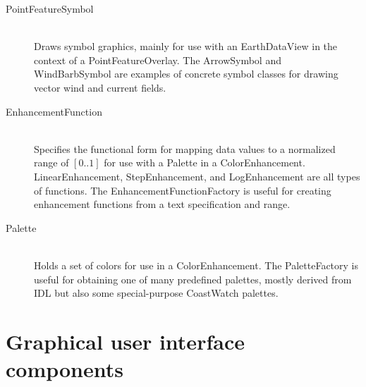 \begin{description}
\item[{\java PointFeatureSymbol}]~\\ Draws symbol graphics, mainly
for use with an {\java EarthDataView} in the context of a {\java
PointFeatureOverlay}.  The {\java ArrowSymbol} and {\java
WindBarbSymbol} are examples of concrete symbol classes for
drawing vector wind and current fields.

\item[{\java EnhancementFunction}]~\\ Specifies the functional
form for mapping data values to a normalized range of $[0..1]$
for use with a {\java Palette} in a {\java ColorEnhancement}.
{\java LinearEnhancement}, {\java StepEnhancement}, and {\java
LogEnhancement} are all types of functions.  The {\java
EnhancementFunctionFactory} is useful for creating enhancement
functions from a text specification and range.

\item[{\java Palette}]~\\ Holds a set of colors for use in a
{\java ColorEnhancement}.  The {\java PaletteFactory} is useful
for obtaining one of many predefined palettes, mostly derived
from IDL but also some special-purpose CoastWatch palettes.

\end{description}

\section{Graphical user interface components}

